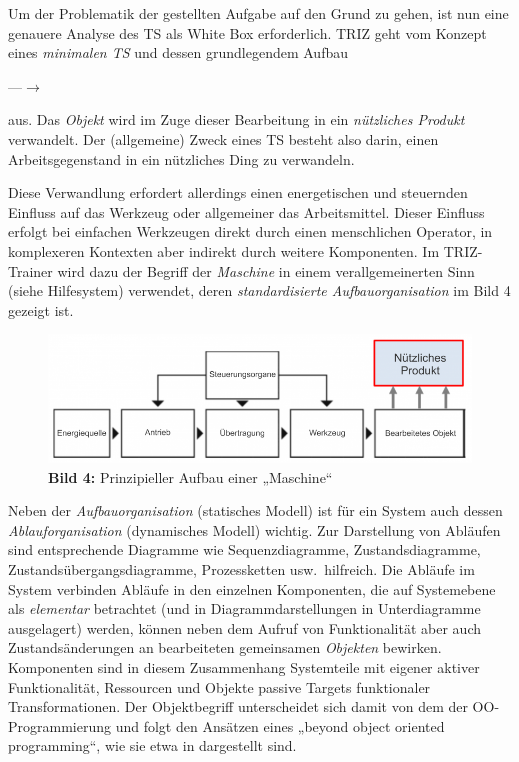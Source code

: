 \documentclass[11pt,a4paper]{article}
\newcommand{\normbox}[1]{{\fboxsep2mm\fbox{\rule[-4pt]{0pt}{12pt}#1}}}
\begin{document}
Um der Problematik der gestellten Aufgabe auf den Grund zu gehen, ist nun eine
genauere Analyse des TS als White Box erforderlich.  TRIZ geht vom Konzept
eines \emph{minimalen TS} und dessen grundlegendem Aufbau 
\begin{center}
  \normbox{Werkzeug} ---\normbox{bearbeitet}$\rightarrow$ \normbox{Objekt} 
\end{center}
aus.  Das \emph{Objekt} wird im Zuge dieser Bearbeitung in ein
\emph{nützliches Produkt} verwandelt.  Der (allgemeine) Zweck eines TS besteht
also darin, einen Arbeitsgegenstand in ein nützliches Ding zu verwandeln.

Diese Verwandlung erfordert allerdings einen energetischen und steuernden
Einfluss auf das Werkzeug oder allgemeiner das Arbeitsmittel.  Dieser Einfluss
erfolgt bei einfachen Werkzeugen direkt durch einen menschlichen Operator, in
komplexeren Kontexten aber indirekt durch weitere Komponenten. Im TRIZ-Trainer
wird dazu der Begriff der \emph{Maschine} in einem verallgemeinerten Sinn
(siehe Hilfesystem) verwendet, deren \emph{standardisierte Aufbauorganisation}
im Bild 4 gezeigt ist.
\begin{figure}[ht]\centering
  \includegraphics[width=.8\textwidth]{965_xxl.png}\\[4pt]
  \textbf{Bild 4:} Prinzipieller Aufbau einer „Maschine“
\end{figure}

Neben der \emph{Aufbauorganisation} (statisches Modell) ist für ein System
auch dessen \emph{Ablauforganisation} (dynamisches Modell) wichtig. Zur
Darstellung von Abläufen sind entsprechende Diagramme wie Sequenzdiagramme,
Zustandsdiagramme, Zustandsübergangsdiagramme, Prozessketten
usw.\ hilfreich. Die Abläufe im System verbinden Abläufe in den einzelnen
Komponenten, die auf Systemebene als \emph{elementar} betrachtet (und in
Diagrammdarstellungen in Unterdiagramme ausgelagert) werden, können neben dem
Aufruf von Funktionalität aber auch Zustandsänderungen an bearbeiteten
gemeinsamen \emph{Objekten} bewirken.  Komponenten sind in diesem Zusammenhang
Systemteile mit eigener aktiver Funktionalität, Ressourcen und Objekte passive
Targets funktionaler Transformationen. Der Objektbegriff unterscheidet sich
damit von dem der OO-Programmierung und folgt den Ansätzen eines „beyond
object oriented programming“, wie sie etwa in \cite{Szyperski2002} dargestellt
sind.
\end{document}
